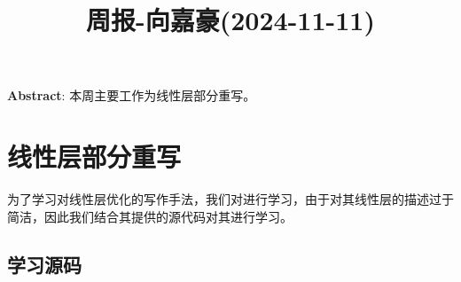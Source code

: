 \documentclass[11pt,a4paper]{article}
\title{周报-向嘉豪(2024-11-11)}
\renewcommand{\maketitle}{
  \begin{center}
    \LARGE\bfseries\thetitle
  \end{center}
}
\begin{document}
\maketitle


\noindent \textbf{Abstract}: 本周主要工作为线性层部分重写。


\section{线性层部分重写}

为了学习对线性层优化的写作手法，我们对\cite{Leurent2024}进行学习，由于\cite{Leurent2024}对其线性层的描述过于简洁，因此我们结合其提供的源代码对其进行学习。

\subsection{学习\cite{Leurent2024}源码}






\end{document}
